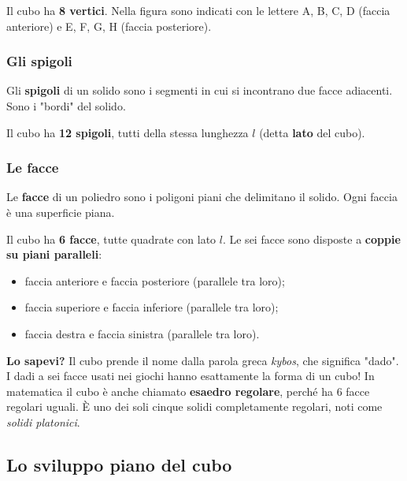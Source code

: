 Il cubo ha \textbf{8 vertici}. Nella figura sono indicati con le lettere A, B, C, D (faccia anteriore) e E, F, G, H (faccia posteriore).

\subsubsection{Gli spigoli}

\begin{definizione}
    Gli \textbf{spigoli} di un solido sono i segmenti in cui si incontrano due facce adiacenti. Sono i "bordi" del solido.
\end{definizione}

Il cubo ha \textbf{12 spigoli}, tutti della stessa lunghezza $l$ (detta \textbf{lato} del cubo).

\subsubsection{Le facce}

\begin{definizione}
    Le \textbf{facce} di un poliedro sono i poligoni piani che delimitano il solido. Ogni faccia è una superficie piana.
\end{definizione}

Il cubo ha \textbf{6 facce}, tutte quadrate con lato $l$. Le sei facce sono disposte a \textbf{coppie su piani paralleli}:
\begin{itemize}[leftmargin=1.4em]
    \item faccia anteriore e faccia posteriore (parallele tra loro);
    \item faccia superiore e faccia inferiore (parallele tra loro);
    \item faccia destra e faccia sinistra (parallele tra loro).
\end{itemize}

\begin{sapevi}
    \textbf{Lo sapevi?} Il cubo prende il nome dalla parola greca \emph{kybos}, che significa "dado". I dadi a sei facce usati nei giochi hanno esattamente la forma di un cubo! In matematica il cubo è anche chiamato \textbf{esaedro regolare}, perché ha 6 facce regolari uguali. È uno dei soli cinque solidi completamente regolari, noti come \emph{solidi platonici}.
\end{sapevi}

\subsection{Lo sviluppo piano del cubo}

